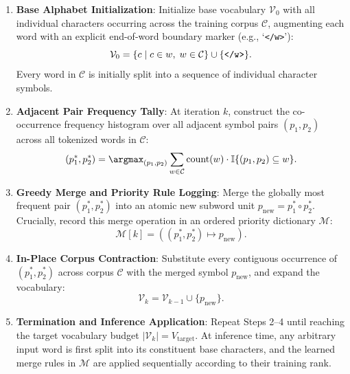 \documentclass[../../main.tex]{subfiles}
\begin{document}
\begin{enumerate}
    \item \textbf{Base Alphabet Initialization}: Initialize base vocabulary $\mathcal{V}_0$ with all individual characters occurring across the training corpus $\mathcal{C}$, augmenting each word with an explicit end-of-word boundary marker (e.g., `\texttt{</w>}'):
    \begin{equation}
    \label{eq:bpe_init_vocab}
    \mathcal{V}_0 = \{c \mid c \in w, \; w \in \mathcal{C}\} \cup \{\text{\texttt{</w>}}\}.
    \end{equation}
    Every word in $\mathcal{C}$ is initially split into a sequence of individual character symbols.
    
    \item \textbf{Adjacent Pair Frequency Tally}: At iteration $k$, construct the co-occurrence frequency histogram over all adjacent symbol pairs $(p_1, p_2)$ across all tokenized words in $\mathcal{C}$:
    \begin{equation}
    \label{eq:bpe_pair_freq}
    (p_1^*, p_2^*) = \argmax_{(p_1, p_2)} \sum_{w \in \mathcal{C}} \text{count}(w) \cdot \mathbb{I}\{(p_1, p_2) \subseteq w\}.
    \end{equation}
    
    \item \textbf{Greedy Merge and Priority Rule Logging}: Merge the globally most frequent pair $(p_1^*, p_2^*)$ into an atomic new subword unit $p_{\text{new}} = p_1^* \circ p_2^*$. Crucially, record this merge operation in an ordered priority dictionary $\mathcal{M}$:
    \begin{equation}
    \label{eq:bpe_merge_rule}
    \mathcal{M}[k] = ((p_1^*, p_2^*) \mapsto p_{\text{new}}).
    \end{equation}
    
    \item \textbf{In-Place Corpus Contraction}: Substitute every contiguous occurrence of $(p_1^*, p_2^*)$ across corpus $\mathcal{C}$ with the merged symbol $p_{\text{new}}$, and expand the vocabulary:
    \begin{equation}
    \label{eq:bpe_vocab_update}
    \mathcal{V}_k = \mathcal{V}_{k-1} \cup \{p_{\text{new}}\}.
    \end{equation}
    
    \item \textbf{Termination and Inference Application}: Repeat Steps 2--4 until reaching the target vocabulary budget $|\mathcal{V}_k| = V_{\text{target}}$. At inference time, any arbitrary input word is first split into its constituent base characters, and the learned merge rules in $\mathcal{M}$ are applied sequentially according to their training rank.
\end{enumerate}
\end{document}

